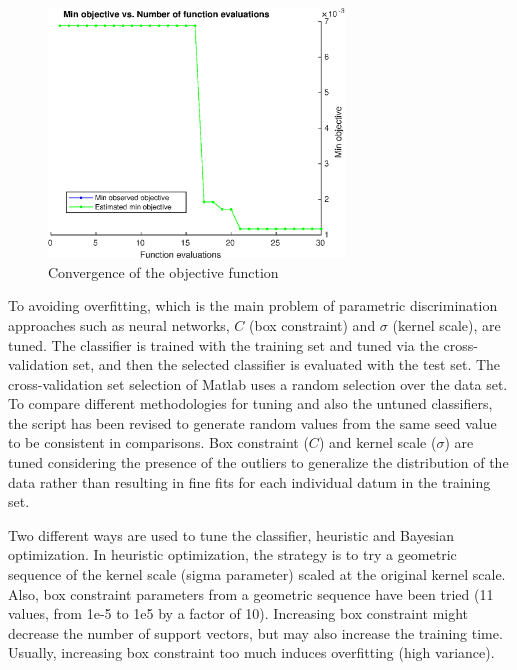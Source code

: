 \begin{figure}
\begin{center}
\includegraphics[width=0.7\textwidth]{figures/objectiveFuncEval}    %
\caption{Convergence of the objective function} 
\label{fig:objectiveFuncEval}
\end{center}
\end{figure}

To avoiding overfitting, which is the main problem of parametric discrimination approaches such as neural networks, $C$ (box constraint) and $\sigma$ (kernel scale), are tuned.
The classifier is trained with the training set and tuned via the cross-validation set, and then the selected classifier is evaluated with the test set. The cross-validation set selection of Matlab uses a random selection over the data set. 
To compare different methodologies for tuning and also the untuned classifiers, the script has been revised to generate random values from the same seed value to be consistent in comparisons.
Box constraint ($C$) and kernel scale ($\sigma$) are tuned considering the presence of the outliers to generalize the distribution of the data rather than resulting in fine fits for each individual datum in the training set. 

Two different ways are used to tune the classifier, heuristic and Bayesian optimization. In heuristic optimization, the strategy is to try a geometric sequence of the kernel scale (sigma parameter) scaled at the original kernel scale.  
Also, box constraint parameters from a geometric sequence have been tried (11 values, from 1e-5 to 1e5 by a factor of 10). Increasing box constraint might decrease the number of support vectors, but may also increase the training time. 
Usually, increasing box constraint too much induces overfitting (high variance). 


